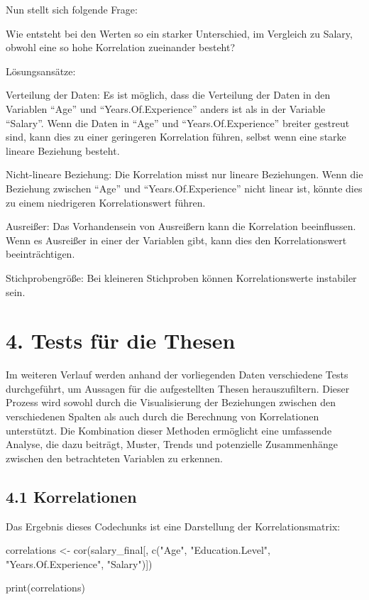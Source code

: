 \documentclass[
  letterpaper,
  DIV=11,
  numbers=noendperiod]{scrartcl}
\newenvironment{Shaded}{\begin{snugshade}}{\end{snugshade}}
\newcommand{\FunctionTok}[1]{\textcolor[rgb]{0.28,0.35,0.67}{#1}}
\newcommand{\NormalTok}[1]{\textcolor[rgb]{0.00,0.23,0.31}{#1}}
\newcommand{\OtherTok}[1]{\textcolor[rgb]{0.00,0.23,0.31}{#1}}
\newcommand{\StringTok}[1]{\textcolor[rgb]{0.13,0.47,0.30}{#1}}
\begin{document}
Nun stellt sich folgende Frage:

Wie entsteht bei den Werten so ein starker Unterschied, im Vergleich zu
Salary, obwohl eine so hohe Korrelation zueinander besteht?

Lösungsansätze:

Verteilung der Daten: Es ist möglich, dass die Verteilung der Daten in
den Variablen ``Age'' und ``Years.Of.Experience'' anders ist als in der
Variable ``Salary''. Wenn die Daten in ``Age'' und
``Years.Of.Experience'' breiter gestreut sind, kann dies zu einer
geringeren Korrelation führen, selbst wenn eine starke lineare Beziehung
besteht.

Nicht-lineare Beziehung: Die Korrelation misst nur lineare Beziehungen.
Wenn die Beziehung zwischen ``Age'' und ``Years.Of.Experience'' nicht
linear ist, könnte dies zu einem niedrigeren Korrelationswert führen.

Ausreißer: Das Vorhandensein von Ausreißern kann die Korrelation
beeinflussen. Wenn es Ausreißer in einer der Variablen gibt, kann dies
den Korrelationswert beeinträchtigen.

Stichprobengröße: Bei kleineren Stichproben können Korrelationswerte
instabiler sein.

\hypertarget{tests-fuxfcr-die-thesen}{%
\section{4. Tests für die Thesen}\label{tests-fuxfcr-die-thesen}}

Im weiteren Verlauf werden anhand der vorliegenden Daten verschiedene
Tests durchgeführt, um Aussagen für die aufgestellten Thesen
herauszufiltern. Dieser Prozess wird sowohl durch die Visualisierung der
Beziehungen zwischen den verschiedenen Spalten als auch durch die
Berechnung von Korrelationen unterstützt. Die Kombination dieser
Methoden ermöglicht eine umfassende Analyse, die dazu beiträgt, Muster,
Trends und potenzielle Zusammenhänge zwischen den betrachteten Variablen
zu erkennen.

\hypertarget{korrelationen-1}{%
\subsection{4.1 Korrelationen}\label{korrelationen-1}}

Das Ergebnis dieses Codechunks ist eine Darstellung der
Korrelationsmatrix:

\begin{Shaded}
\begin{Highlighting}[]
\NormalTok{correlations }\OtherTok{\textless{}{-}} \FunctionTok{cor}\NormalTok{(salary\_final[, }\FunctionTok{c}\NormalTok{(}\StringTok{"Age"}\NormalTok{, }\StringTok{"Education.Level"}\NormalTok{, }\StringTok{"Years.Of.Experience"}\NormalTok{, }\StringTok{"Salary"}\NormalTok{)])}

\FunctionTok{print}\NormalTok{(correlations)}
\end{Highlighting}
\end{Shaded}
\end{document}
